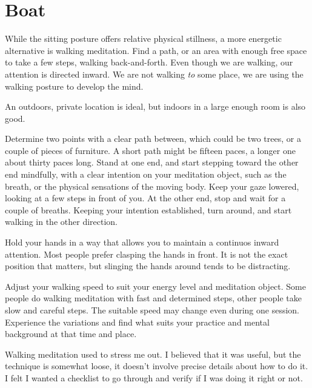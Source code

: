 \chapter{Boat}


While the sitting posture offers relative physical stillness, a more
energetic alternative is walking meditation. Find a path, or an area
with enough free space to take a few steps, walking back-and-forth. Even
though we are walking, our attention is directed inward. We are not
walking \emph{to} some place, we are using the walking posture to
develop the mind.

An outdoors, private location is ideal, but indoors in a large enough
room is also good.

Determine two points with a clear path between, which could be two
trees, or a couple of pieces of furniture. A short path might be fifteen
paces, a longer one about thirty paces long. Stand at one end, and start
stepping toward the other end mindfully, with a clear intention on your
meditation object, such as the breath, or the physical sensations of the
moving body. Keep your gaze lowered, looking at a few steps in front of
you. At the other end, stop and wait for a couple of breaths. Keeping
your intention established, turn around, and start walking in the other
direction.

Hold your hands in a way that allows you to maintain a continuos inward
attention. Most people prefer clasping the hands in front. It is not the
exact position that matters, but slinging the hands around tends to be
distracting.

\clearpage
\thispagestyle{empty}\mbox{}
\clearpage

Adjust your walking speed to suit your energy level and meditation
object. Some people do walking meditation with fast and determined
steps, other people take slow and careful steps. The suitable speed may
change even during one session. Experience the variations and find what
suits your practice and mental background at that time and place.


Walking meditation used to stress me out. I believed that it was useful,
but the technique is somewhat loose, it doesn't involve precise details
about how to do it. I felt I wanted a checklist to go through and verify
if I was doing it right or not.

